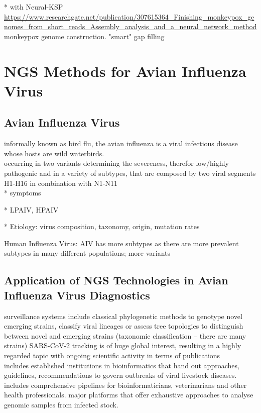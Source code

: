* with Neural-KSP \url{https://www.researchgate.net/publication/307615364_Finishing_monkeypox_genomes_from_short_reads_Assembly_analysis_and_a_neural_network_method}
monkeypox genome construction. "smart" gap filling




\section{NGS Methods for Avian Influenza Virus}\label{sec:AIV}
\subsection{Avian Influenza Virus}

informally known as bird flu, the avian influenza is a viral infectious disease whose hosts are wild waterbirds. \\
occurring in two variants determining the severeness, therefor low/highly pathogenic and in a variety of subtypes, that are composed by two viral segments H1-H16 in combination with N1-N11 \\

* symptoms

* LPAIV, HPAIV

* Etiology: virus composition, taxonomy, origin, mutation rates

Human Influenza Virus:
AIV has more subtypes as there are more prevalent subtypes in many different populations; more variants

\subsection{Application of NGS Technologies in Avian Influenza Virus Diagnostics}
surveillance systems include classical phylogenetic methods to genotype novel emerging strains, classify viral lineages or assess tree topologies to distinguish between novel and emerging strains (taxonomic classification -- there are many strains)
SARS-CoV-2 tracking is of huge global interest, resulting in a highly regarded topic with ongoing scientific activity in terms of publications \\
includes established institutions in bioinformatics that hand out approaches, guidelines, recommendations to govern outbreaks of viral livestock diseases. includes comprehensive pipelines for bioinformaticians, veterinarians and other health professionals.
major platforms that offer exhaustive approaches to analyse genomic samples from infected stock. \\


